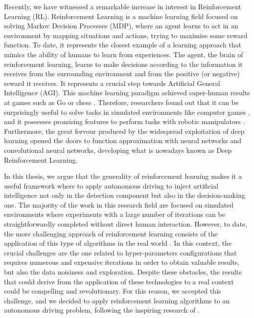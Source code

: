 Recently, we have witnessed a remarkable increase in interest in Reinforcement Learning (RL).
Reinforcement Learning is a machine learning field focused on solving Markov Decision Processes (MDP), where an agent learns to act in an environment by mapping situations and actions, trying to maximise some reward function.
To date, it represents the closest example of a learning approach that mimics the ability of humans to learn from experiences.
The agent, the brain of reinforcement learning, learns to make decisions according to the information it receives from the surrounding environment and from the positive (or negative) reward it receives.
It represents a crucial step towards Artificial General Intelligence (AGI).
This machine learning paradigm achieved super-human results at games such as Go \cite{silver2016mastering} or chess \cite{silver2017mastering}.
Therefore, researchers found out that it can be surprisingly useful to solve tasks in simulated environments like computer games \cite{mnih2013playing}, and it possesses promising features to perform tasks with robotic manipulators \cite{gu2017deep}.
Furthermore, the great fervour produced by the widespread exploitation of deep learning opened the doors to function approximation with neural networks and convolutional neural networks, developing what is nowadays known as Deep Reinforcement Learning.

In this thesis, we argue that the generality of reinforcement learning makes it a useful framework where to apply autonomous driving to inject artificial intelligence not only in the detection component but also in the decision-making one.
The majority of the work in this research field are focused on simulated environments where experiments with a large number of iterations can be straightforwardly completed without direct human interaction.
However, to date, the more challenging approach of reinforcement learning consists of the application of this type of algorithms in the real world \cite{kendall2019nowisthetime}.
In this context, the crucial challenges are the one related to hyper-parameters configurations that requires numerous and expensive iterations in order to obtain valuable results, but also the data noisiness and exploration.
Despite these obstacles, the results that could derive from the application of these technologies to a real context could be compelling and revolutionary.
For this reason, we accepted this challenge, and we decided to apply reinforcement learning algorithms to an autonomous driving problem, following the inspiring research of \cite{kendall2018learning}.


